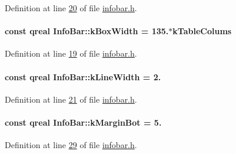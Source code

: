 Definition at line \hyperlink{infobar_8h_source_l00020}{20} of file \hyperlink{infobar_8h_source}{infobar.\+h}.

\hypertarget{class_info_bar_aa1c35ddbae0324743d90721037447571}{}
\paragraph[{k\+Box\+Width}]{\setlength{\rightskip}{0pt plus 5cm}const qreal Info\+Bar\+::k\+Box\+Width = 135.$\ast${\bf k\+Table\+Colums}\hspace{0.3cm}{\ttfamily [static]}}\label{class_info_bar_aa1c35ddbae0324743d90721037447571}


Definition at line \hyperlink{infobar_8h_source_l00019}{19} of file \hyperlink{infobar_8h_source}{infobar.\+h}.

\hypertarget{class_info_bar_a46d929f42476a6ad37422adee1783712}{}
\paragraph[{k\+Line\+Width}]{\setlength{\rightskip}{0pt plus 5cm}const qreal Info\+Bar\+::k\+Line\+Width = 2.\hspace{0.3cm}{\ttfamily [static]}}\label{class_info_bar_a46d929f42476a6ad37422adee1783712}


Definition at line \hyperlink{infobar_8h_source_l00021}{21} of file \hyperlink{infobar_8h_source}{infobar.\+h}.

\hypertarget{class_info_bar_a67eb740893ed91c75f237cee756648cc}{}
\paragraph[{k\+Margin\+Bot}]{\setlength{\rightskip}{0pt plus 5cm}const qreal Info\+Bar\+::k\+Margin\+Bot = 5.\hspace{0.3cm}{\ttfamily [static]}}\label{class_info_bar_a67eb740893ed91c75f237cee756648cc}


Definition at line \hyperlink{infobar_8h_source_l00029}{29} of file \hyperlink{infobar_8h_source}{infobar.\+h}.

\hypertarget{class_info_bar_a0cfbafbc9f780fc1366157b9c8379463}{}
